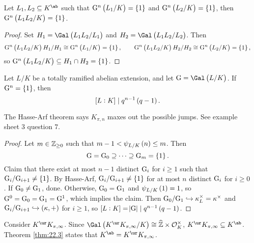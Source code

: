 \begin{lemma}
\label{lem:23.4}
Let $ L_1, L_2 \subseteq K^{\ab} $ such that $ \G^n\br{L_1 / K} = \cbr{1} $ and $ \G^n\br{L_2 / K} = \cbr{1} $, then $ \G^n\br{L_1L_2 / K} = \cbr{1} $.
\end{lemma}

\begin{proof}
Set $ H_1 = \Gal\br{L_1L_2 / L_1} $ and $ H_2 = \Gal\br{L_1L_2 / L_2} $. Then
$$ \G^n\br{L_1L_2 / K}H_1 / H_1 \cong \G^n\br{L_1 / K} = \cbr{1}, \qquad \G^n\br{L_1L_2 / K}H_2 / H_2 \cong \G^n\br{L_2 / K} = \cbr{1}, $$
so $ \G^n\br{L_1L_2 / K} \subseteq H_1 \cap H_2 = \cbr{1} $.
\end{proof}

\begin{corollary}
\label{cor:23.5}
Let $ L / K $ be a totally ramified abelian extension, and let $ \G = \Gal\br{L / K} $. If $ \G^n = \cbr{1} $, then
$$ \sbr{L : K} \mid q^{n - 1}\br{q - 1}. $$
\end{corollary}

\begin{remark*}
The Hasse-Arf theorem says $ K_{\pi, n} $ maxes out the possible jumps. See example sheet $ 3 $ question $ 7 $.
\end{remark*}

\begin{proof}
Let $ m \in \mathbb{Z}_{\ge 0} $ such that $ m - 1 < \psi_{L / K}\br{n} \le m $. Then
$$ \G = \G_0 \supseteq \dots \supseteq \G_m = \cbr{1}. $$
Claim that there exist at most $ n - 1 $ distinct $ \mathrm{G}_i $ for $ i \ge 1 $ such that $ \G_i / \G_{i + 1} \ne \cbr{1} $. By Hasse-Arf, $ \G_i / \G_{i + 1} \ne \cbr{1} $ for at most $ n $ distinct $ \mathrm{G}_i $ for $ i \ge 0 $. If $ \mathrm{G}_0 \ne \mathrm{G}_1 $, done. Otherwise, $ \mathrm{G}_0 = \mathrm{G}_1 $ and $ \psi_{L / K}\br{1} = 1 $, so $ \mathrm{G}^0 = \mathrm{G}_0 = \mathrm{G}_1 = \mathrm{G}^1 $, which implies the claim. Then $ \mathrm{G}_0 / \mathrm{G}_1 \hookrightarrow \kappa_L^\times = \kappa^\times $ and $ \G_i / \G_{i + 1} \hookrightarrow \br{\kappa, +} $ for $ i \ge 1 $, so $ \sbr{L : K} = \abs{\G} \mid q^{n - 1}\br{q - 1} $.
\end{proof}

Consider $ K^{\ur}K_{\pi, \infty} $. Since $ \Gal\br{K^{\ur}K_{\pi, \infty} / K} \cong \widehat{\ZZ} \times \OOO_K^\times $, $ K^{\ur}K_{\pi, \infty} \subseteq K^{\ab} $. Theorem \ref{thm:22.3} states that $ K^{\ab} = K^{\ur}K_{\pi, \infty} $.

